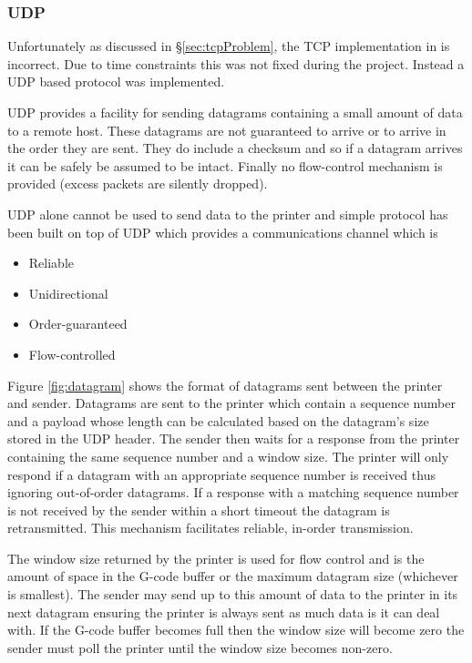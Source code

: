 				\subsubsection{UDP}
					
					Unfortunately as discussed in \S\ref{sec:tcpProblem}, the TCP
					implementation in \uIP{} is incorrect. Due to time constraints this
					was not fixed during the project. Instead a UDP based protocol was
					implemented.
					
					UDP provides a facility for sending datagrams containing a small
					amount of data to a remote host. These datagrams are not guaranteed to
					arrive or to arrive in the order they are sent. They do include a
					checksum and so if a datagram arrives it can be safely be assumed to
					be intact. Finally no flow-control mechanism is provided (excess
					packets are silently dropped).
					
					UDP alone cannot be used to send data to the printer and simple
					protocol has been built on top of UDP which provides a communications
					channel which is
					\begin{itemize}
						\item Reliable
						\item Unidirectional
						\item Order-guaranteed
						\item Flow-controlled
					\end{itemize}
					
					Figure \ref{fig:datagram} shows the format of datagrams sent between
					the printer and sender. Datagrams are sent to the printer which
					contain a sequence number and a payload whose length can be calculated
					based on the datagram's size stored in the UDP header. The sender then
					waits for a response from the printer containing the same sequence
					number and a window size. The printer will only respond if a datagram
					with an appropriate sequence number is received thus ignoring
					out-of-order datagrams. If a response with a matching sequence number
					is not received by the sender within a short timeout the datagram is
					retransmitted. This mechanism facilitates reliable, in-order
					transmission.
					
					The window size returned by the printer is used for flow control and
					is the amount of space in the G-code buffer or the maximum datagram
					size (whichever is smallest). The sender may send up to this amount of
					data to the printer in its next datagram ensuring the printer is
					always sent as much data is it can deal with. If the G-code buffer
					becomes full then the window size will become zero the sender must
					poll the printer until the window size becomes non-zero.
					
